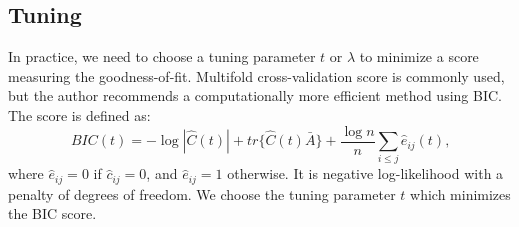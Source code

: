 \subsection*{Tuning}
In practice, we need to choose a tuning parameter $t$ or $\lambda$ to minimize a score measuring the goodness-of-fit. Multifold cross-validation score is commonly used, but the author recommends a computationally more efficient method using BIC. The score is defined as: 
\[BIC(t)=-\log|\hat{C}(t)|+tr\{\hat{C}(t)\bar{A}\}+\frac{\log n}{n}\sum_{i\leq j}\hat{e}_{ij}(t)\mbox{,}\]
where $\hat{e}_{ij}=0$ if $\hat{c}_{ij}=0$, and $\hat{e}_{ij}=1$ otherwise. It is negative log-likelihood with a penalty of degrees of freedom. We choose the tuning parameter $t$ which minimizes the BIC score.

